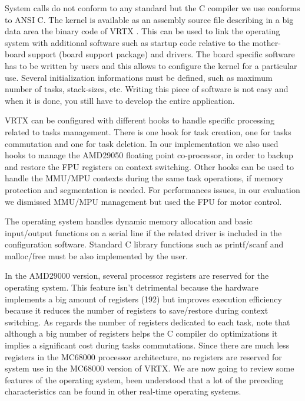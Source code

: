 \documentclass[10pt]{report}
\begin{document}
System calls do not conform to any standard but the C compiler we 
use conforms to ANSI C. The kernel is available as an assembly 
source file describing in a big data area the binary code of VRTX 
. This can be used to link the operating system with additional
software such as startup code relative to the mother-board support
(board support package) and drivers. The board specific software
has to be written by users and this allows to configure the kernel
for a particular use. Several initialization informations must be
defined, such as maximum number of tasks, stack-sizes, etc. Writing
this piece of software is not easy and when it is done, you still have to 
develop the entire application.

VRTX can be configured with different hooks to handle specific 
processing related to tasks management. There is one hook for 
task creation, one for tasks commutation and one for task 
deletion. In our implementation we also used hooks to manage the 
AMD29050 floating point co-processor, in order to backup and 
restore the FPU registers on context switching. Other hooks can 
be used to handle the MMU/MPU contexts during the same task 
operations, if memory protection and segmentation is needed. For 
performances issues, in our evaluation we dismissed MMU/MPU 
management but used the FPU for motor control.

The operating system handles dynamic memory allocation and basic 
input/output functions on a serial line if the related driver is 
included in the configuration software. Standard C library 
functions such as printf/scanf and malloc/free must be also 
implemented by the user.

In the AMD29000 version, several processor registers are reserved 
for the operating system. This feature isn't detrimental because 
the hardware implements a big amount of registers (192) but 
improves execution efficiency because it reduces the number of 
registers to save/restore during context switching. As regards 
the number of registers dedicated to each task, note that 
although a big number of registers helps the C compiler do 
optimizations it implies a significant cost during tasks 
commutations. Since there are much less registers in the MC68000 
processor architecture, no registers are reserved for system use 
in the MC68000 version of VRTX. We are now going to review some 
features of the operating system, been understood that a lot of 
the preceding characteristics can be found in other real-time 
operating systems.
\end{document}
